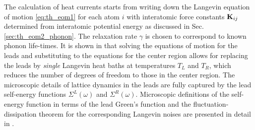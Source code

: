 The calculation of heat currents starts from writing down the Langevin equation of motion \eqref{eq:th_eom1} for each atom $i$ with interatomic force constants $\mathbf{K}_{ij}$ determined from interatomic potential energy as discussed in Sec. \ref{sec:th_eom2_phonon}. The relaxation rate $\gamma$ is chosen to correspond to known phonon life-times. It is shown in  that solving the equations of motion for the leads and substituting to the equations for the center region allows for replacing the leads by \textit{single} Langevin heat baths at temperatures $T_L$ and $T_R$, which reduces the number of degrees of freedom to those in the center region. The microscopic details of lattice dynamics in the leads are fully captured by the lead self-energy functions $\Sigma^L(\omega)$ and $\Sigma^R(\omega)$. Microscopic definitions of the self-energy function in terms of the lead Green's function and the fluctuation-dissipation theorem for the corresponding Langevin noises are presented in detail in .





